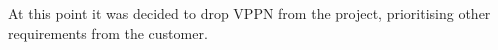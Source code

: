At this point it was decided to drop VPPN from the project, prioritising other
requirements from the customer.

%
